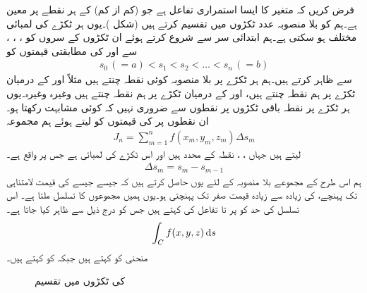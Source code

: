 فرض کریں کہ  متغیر  کا ایسا استمراری تفاعل ہے  جو (کم از کم)  کے ہر نقطے پر معین ہے۔ہم  کو بلا منصوبہ  عدد ٹکڑوں میں تقسیم کرتے ہیں (شکل )۔یوں ہر ٹکڑے کی لمبائی مختلف ہو سکتی ہے۔ہم ابتدائی سر سے شروع کرتے ہوئے ان ٹکڑوں کے سروں کو ، ، ،   سے اور  کی مطابقتی قیمتوں کو
\begin{align*}
s_0\,(=a)<s_1<s_2<\dots<s_n\,(=b)
\end{align*}
سے ظاہر کرتے ہیں۔ہم ہر ٹکڑے پر بلا منصوبہ کوئی نقطہ چنتے ہیں مثلاً  اور  کے درمیان ٹکڑے پر ہم نقطہ  چنتے ہیں،  اور  کے درمیان ٹکڑے پر ہم نقطہ  چنتے ہیں وغیرہ وغیرہ۔یوں ہر ٹکڑے پر نقطہ باقی ٹکڑوں پر نقطوں سے ضروری نہیں کہ کوئی مشابہت رکھتا ہو۔ ان نقطوں پر  کی قیمتوں کو لیتے ہوئے ہم مجموعہ
\begin{align}\label{مساوات_خطی_تکمل_تعریف_بطور_مجموعہ}
J_n=\sum_{m=1}^{n} f(x_m,y_m,z_m)\Delta s_m
\end{align}
لیتے ہیں جہاں ، ،  نقطہ  کے محدد ہیں اور  اس ٹکڑے کی لمبائی ہے جس پر  واقع ہے۔
\begin{align*}
\Delta s_m=s_m-s_{m-1}
\end{align*}
ہم اس طرح کے مجموعے بلا منصوبہ   کے لئے یوں حاصل کرتے ہیں کہ جیسے جیسے  کی قیمت لامتناہی تک پہنچے،  کی زیادہ سے زیادہ قیمت صفر تک پہنچتی ہو۔یوں ہمیں مجموعوں کا تسلسل  ملتا ہے۔ اس تسلسل کی حد کو  پر  تا  تفاعل  کی  کہتے ہیں جس کو درج ذیل سے ظاہر کیا جاتا ہے۔
\begin{align*}
\int_C f(x,y,z)\dif s
\end{align*}
منحنی  کو  کہتے ہیں جبکہ  کو  کہتے ہیں۔
%
\begin{figure}
\centering
{}
\caption{ کی ٹکڑوں میں تقسیم}
\label{شکل_سمتی_تکمل_راہ_کی_تقسیم}
\end{figure}

